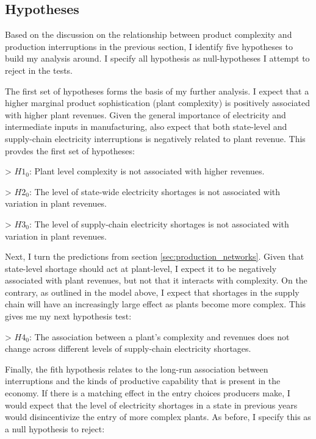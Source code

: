 \documentclass[11pt]{article}
\begin{document}

\subsection{Hypotheses}
\label{sub:hyp}
Based on the discussion on the relationship between product complexity and production interruptions in the previous section, I identify five hypotheses to build my analysis around. I specify all hypothesis as null-hypotheses I attempt to reject in the tests. 

The first set of hypotheses forms the basis of my further analysis. I expect that a higher marginal product sophistication (plant complexity) is positively associated with higher plant revenues. Given the general importance of electricity and intermediate inputs in manufacturing, also expect that both state-level and supply-chain electricity interruptions is negatively related to plant revenue. This provdes the first set of hypotheses:

> $H1_0$: Plant level complexity is not associated with higher revenues.

> $H2_0$: The level of state-wide electricity shortages is not associated with variation in plant revenues.

> $H3_0$: The level of supply-chain electricity shortages is not associated with variation in plant revenues.

Next, I turn the predictions from section \ref{sec:production_networks}. Given that state-level shortage should act at plant-level, I expect it to be negatively associated with plant revenues, but not that it interacts with complexity. On the contrary, as outlined in the model above, I expect that shortages in the supply chain will have an increasingly large effect as plants become more complex. This gives me my next hypothesis test:

> $H4_0$: The association between a plant's complexity and revenues does not change across different levels of supply-chain electricity shortages.

Finally, the fith hypothesis relates to the long-run association between interruptions and the kinds of productive capability that is present in the economy. If there is a matching effect in the entry choices producers make, I would expect that the level of electricity shortages in a state in previous years would disincentivize the entry of more complex plants. As before, I specify this as a null hypothesis to reject:
\end{document}
